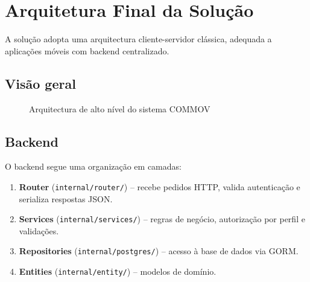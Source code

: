 \documentclass[12pt,a4paper]{article}
\begin{document}
\section{Arquitetura Final da Solução}

A solução adopta uma arquitectura cliente-servidor clássica, adequada a aplicações móveis com backend centralizado.

\subsection{Visão geral}

\begin{figure}[H]
\centering
{}
\caption{Arquitectura de alto nível do sistema COMMOV}\label{fig:arch}
\end{figure}

\subsection{Backend}

O backend segue uma organização em camadas:

\begin{enumerate}[leftmargin=*]
    \item \textbf{Router} (\texttt{internal/router/}) -- recebe pedidos HTTP, valida autenticação e serializa respostas JSON.
    \item \textbf{Services} (\texttt{internal/services/}) -- regras de negócio, autorização por perfil e validações.
    \item \textbf{Repositories} (\texttt{internal/postgres/}) -- acesso à base de dados via GORM.
    \item \textbf{Entities} (\texttt{internal/entity/}) -- modelos de domínio.
\end{enumerate}
\end{document}
